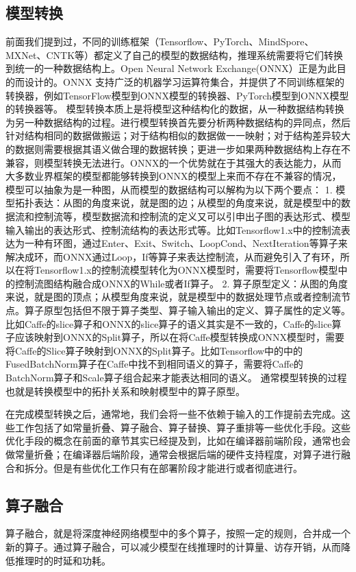 \subsection{模型转换}
前面我们提到过，不同的训练框架（Tensorflow、PyTorch、MindSpore、MXNet、CNTK等）都定义了自己的模型的数据结构，推理系统需要将它们转换到统一的一种数据结构上。Open Neural Network Exchange(ONNX）正是为此目的而设计的。ONNX 支持广泛的机器学习运算符集合，并提供了不同训练框架的转换器，例如TensorFlow模型到ONNX模型的转换器、PyTorch模型到ONNX模型的转换器等。
模型转换本质上是将模型这种结构化的数据，从一种数据结构转换为另一种数据结构的过程。进行模型转换首先要分析两种数据结构的异同点，然后针对结构相同的数据做搬运；对于结构相似的数据做一一映射；对于结构差异较大的数据则需要根据其语义做合理的数据转换；更进一步如果两种数据结构上存在不兼容，则模型转换无法进行。ONNX的一个优势就在于其强大的表达能力，从而大多数业界框架的模型都能够转换到ONNX的模型上来而不存在不兼容的情况，
模型可以抽象为是一种图，从而模型的数据结构可以解构为以下两个要点：
1. 模型拓扑表达：从图的角度来说，就是图的边；从模型的角度来说，就是模型中的数据流和控制流等，模型数据流和控制流的定义又可以引申出子图的表达形式、模型输入输出的表达形式、控制流结构的表达形式等。比如Tensorflow1.x中的控制流表达为一种有环图，通过Enter、Exit、Switch、LoopCond、NextIteration等算子来解决成环，而ONNX通过Loop，If等算子来表达控制流，从而避免引入了有环，所以在将Tensorflow1.x的控制流模型转化为ONNX模型时，需要将Tensorflow模型中的控制流图结构融合成ONNX的While或者If算子。
2. 算子原型定义：从图的角度来说，就是图的顶点；从模型角度来说，就是模型中的数据处理节点或者控制流节点。算子原型包括但不限于算子类型、算子输入输出的定义、算子属性的定义等。比如Caffe的slice算子和ONNX的slice算子的语义其实是不一致的，Caffe的slice算子应该映射到ONNX的Split算子，所以在将Caffe模型转换成ONNX模型时，需要将Caffe的Slice算子映射到ONNX的Split算子。比如Tensorflow中的中的FusedBatchNorm算子在Caffe中找不到相同语义的算子，需要将Caffe的BatchNorm算子和Scale算子组合起来才能表达相同的语义。
通常模型转换的过程也就是转换模型中的拓扑关系和映射模型中的算子原型。

在完成模型转换之后，通常地，我们会将一些不依赖于输入的工作提前去完成。这些工作包括了如常量折叠、算子融合、算子替换、算子重排等一些优化手段。这些优化手段的概念在前面的章节其实已经提及到，比如在编译器前端阶段，通常也会做常量折叠；在编译器后端阶段，通常会根据后端的硬件支持程度，对算子进行融合和拆分。但是有些优化工作只有在部署阶段才能进行或者彻底进行。

\subsection{算子融合}\label{sec:ch09/ch09-kernel-fusion}
算子融合，就是将深度神经网络模型中的多个算子，按照一定的规则，合并成一个新的算子。通过算子融合，可以减少模型在线推理时的计算量、访存开销，从而降低推理时的时延和功耗。

